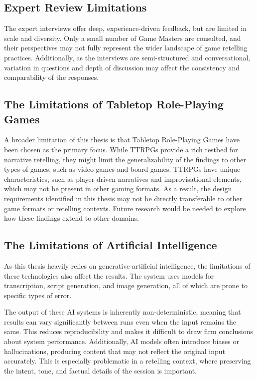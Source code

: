 \subsection*{Expert Review Limitations}
The expert interviews offer deep, experience-driven feedback, but are limited in scale and diversity. Only a small number of Game Masters are consulted, and their perspectives may not fully represent the wider landscape of game retelling practices. Additionally, as the interviews are semi-structured and conversational, variation in questions and depth of discussion may affect the consistency and comparability of the responses.

\subsection*{The Limitations of Tabletop Role-Playing Games}
A broader limitation of this thesis is that Tabletop Role-Playing Games have been chosen as the primary focus. While TTRPGs provide a rich testbed for narrative retelling, they might limit the generalizability of the findings to other types of games, such as video games and board games. TTRPGs have unique characteristics, such as player-driven narratives and improvisational elements, which may not be present in other gaming formats. As a result, the design requirements identified in this thesis may not be directly transferable to other game formats or retelling contexts. Future research would be needed to explore how these findings extend to other domains.

\subsection*{The Limitations of Artificial Intelligence}
As this thesis heavily relies on generative artificial intelligence, the limitations of these technologies also affect the results. The system uses models for transcription, script generation, and image generation, all of which are prone to specific types of error.

The output of these AI systems is inherently non-deterministic, meaning that results can vary significantly between runs even when the input remains the same. This reduces reproducibility and makes it difficult to draw firm conclusions about system performance. Additionally, AI models often introduce biases \cite{luccioni2023stable} or hallucinations\cite{ji2023survey}, producing content that may not reflect the original input accurately. This is especially problematic in a retelling context, where preserving the intent, tone, and factual details of the session is important.

